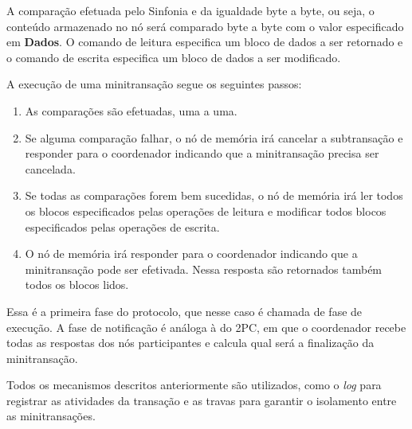 \documentclass[11pt,twoside,a4paper]{book}
\begin{document}
A comparação efetuada pelo Sinfonia e da igualdade byte a byte, ou seja, o conteúdo armazenado no nó será comparado byte a byte com o valor especificado em \textbf{Dados}. O comando de leitura especifica um bloco de dados a ser retornado e o comando de escrita especifica um bloco de dados a ser modificado.

A execução de uma minitransação segue os seguintes passos:

\begin{enumerate}
	\item As comparações são efetuadas, uma a uma.
	\item Se alguma comparação falhar, o nó de memória irá cancelar a subtransação e responder para o coordenador indicando que a minitransação precisa ser cancelada.
	\item Se todas as comparações forem bem sucedidas, o nó de memória irá ler todos os blocos especificados pelas operações de leitura e modificar todos blocos especificados pelas operações de escrita.
	\item O nó de memória irá responder para o coordenador indicando que a minitransação pode ser efetivada. Nessa resposta são retornados também todos os blocos lidos.
\end{enumerate}

Essa é a primeira fase do protocolo, que nesse caso é chamada de fase de execução. A fase de notificação é análoga à do 2PC, em que o coordenador recebe todas as respostas dos nós participantes e calcula qual será a finalização da minitransação.

Todos os mecanismos descritos anteriormente são utilizados, como o \emph{log} para registrar as atividades da transação e as travas para garantir o isolamento entre as minitransações.

\end{document}
